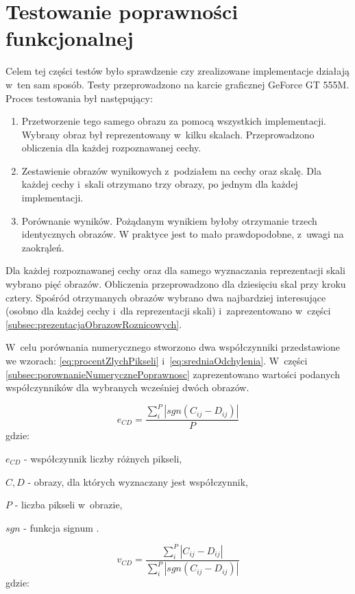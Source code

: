 \section{Testowanie poprawności funkcjonalnej}
\label{sec:testPoprawnosc}

Celem tej części testów było sprawdzenie czy zrealizowane implementacje działają w~ten sam sposób. Testy przeprowadzono na karcie graficznej GeForce GT 555M. Proces testowania był następujący:

\begin{enumerate}
\item Przetworzenie tego samego obrazu za pomocą wszystkich implementacji. Wybrany obraz był reprezentowany w~kilku skalach. Przeprowadzono obliczenia dla każdej rozpoznawanej cechy.
\item Zestawienie obrazów wynikowych z~podziałem na cechy oraz skalę. Dla każdej cechy i~skali otrzymano trzy obrazy, po jednym dla każdej implementacji.
\item Porównanie wyników. Pożądanym wynikiem byłoby otrzymanie trzech identycznych obrazów. W praktyce jest to mało prawdopodobne, z~uwagi na zaokrąleń.
\end{enumerate}

Dla każdej rozpoznawanej cechy oraz dla samego wyznaczania reprezentacji skali wybrano pięć obrazów. Obliczenia przeprowadzono dla dziesięciu skal przy kroku cztery. Spośród otrzymanych obrazów wybrano dwa najbardziej interesujące (osobno dla każdej cechy i~dla reprezentacji skali) i~zaprezentowano w~części \ref{subsec:prezentacjaObrazowRoznicowych}.

W~celu porównania numerycznego stworzono dwa współczynniki przedstawione we wzorach: \eqref{eq:procentZlychPikseli} i~\eqref{eq:sredniaOdchylenia}. W~części \ref{subsec:porownanieNumerycznePoprawnosc} zaprezentowano wartości podanych współczynników dla wybranych wcześniej dwóch obrazów.

\begin{equation}
\label{eq:procentZlychPikseli}
e_{CD} = \frac{\sum_{i}^{P}|sgn(C_{ij}-D_{ij})	|}{P}
\end{equation}
gdzie:

$ e_{CD} $ - współczynnik liczby różnych pikseli,

$ C, D $ - obrazy, dla których wyznaczany jest współczynnik,

$ P $ - liczba pikseli w~obrazie,

$ sgn $ - funkcja signum \cite{Signum}.

\begin{equation}
\label{eq:sredniaOdchylenia}
v_{CD} = \frac{\sum_{i}^{P}|C_{ij}-D_{ij}|}{\sum_{i}^{P}|sgn(C_{ij}-D_{ij})|}
\end{equation}
gdzie:

